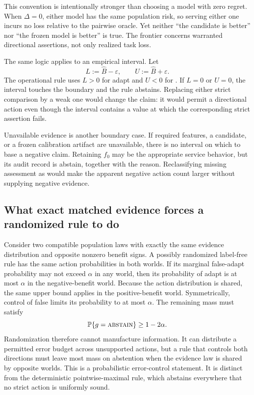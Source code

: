 This convention is intentionally stronger than choosing a model with zero regret.  When
$\Delta=0$, either model has the same population risk, so serving either one incurs no loss relative
to the pairwise oracle.  Yet neither ``the candidate is better'' nor ``the frozen model is better''
is true.  The frontier concerns warranted directional assertions, not only realized task loss.

The same logic applies to an empirical interval.  Let
\begin{equation}
  L:=\widehat B-\varepsilon,
  \qquad
  U:=\widehat B+\varepsilon.
  \label{fr:eq-operational-endpoints}
\end{equation}
The operational rule uses $L>0$ for adapt and $U<0$ for \freeze.  If $L=0$ or $U=0$, the interval
touches the boundary and the rule abstains.  Replacing either strict comparison by a weak one would
change the claim: it would permit a directional action even though the interval contains a value
at which the corresponding strict assertion fails.

Unavailable evidence is another boundary case.  If required features, a candidate, or a frozen
calibration artifact are unavailable, there is no interval on which to base a negative claim.
Retaining $f_0$ may be the appropriate service behavior, but its audit record is abstain, together
with the reason.  Reclassifying missing assessment as \freeze would make the apparent negative
action count larger without supplying negative evidence.

\subsection{What exact matched evidence forces a randomized rule to do}
\label{fr:subsec-randomized-actions}

Consider two compatible population laws with exactly the same evidence distribution and opposite
nonzero benefit signs.  A possibly randomized label-free rule has the same action probabilities in
both worlds.  If its marginal false-adapt probability may not exceed $\alpha$ in any world, then
its probability of adapt is at most $\alpha$ in the negative-benefit world.  Because the action
distribution is shared, the same upper bound applies in the positive-benefit world.  Symmetrically,
control of false \freeze limits its \freeze probability to at most $\alpha$.  The remaining mass
must satisfy
\begin{equation}
  \mathbb{P}\{g=\textnormal{\textsc{abstain}}\}\ge 1-2\alpha.
  \label{fr:eq-matched-abstention}
\end{equation}
Randomization therefore cannot manufacture information.  It can distribute a permitted error
budget across unsupported actions, but a rule that controls both directions must leave most mass on
abstention when the evidence law is shared by opposite worlds.  This is a probabilistic error-control
statement.  It is distinct from the deterministic pointwise-maximal rule, which abstains everywhere
that no strict action is uniformly sound.

